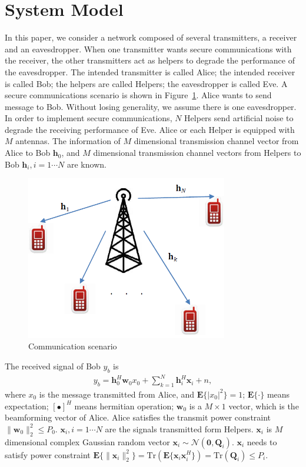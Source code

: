\documentclass[conference]{IEEEtran}
\begin{document}
\section{System Model} \label{sec:system model}
In this paper, we consider a network composed of several transmitters, a receiver and an eavesdropper. When one transmitter wants secure communications with the receiver, the other transmitters act as helpers to degrade the performance of the eavesdropper. The intended transmitter is called Alice; the intended receiver is called Bob; the helpers are called Helpers; the eavesdropper is called Eve. A secure communications scenario is shown in Figure~\ref{fig:system}. Alice wants to send message to Bob. Without losing generality, we assume there is one eavesdropper. In order to implement secure communications, $N$ Helpers send artificial noise to degrade the receiving performance of Eve.  Alice or each Helper is equipped with $M$ antennas. The information of $M$ dimensional transmission channel vector from Alice to Bob $\mathbf{h}_0$, and  $M$ dimensional transmission channel vectors from Helpers to Bob $\mathbf{h}_i, i = 1 \cdots N$ are known.
\begin{figure}[!htbp]
	\centering
	\includegraphics[width=8.8cm]{system.png} %
	\caption{Communication scenario}
	\label{fig:system}
\end{figure}
The received signal of Bob $y_b$ is
\begin{eqnarray}
y_b =\mathbf{h}_0^{H}\mathbf{w}_0x_0 + \sum_{k=1}^N \mathbf{h}_{i}^H\mathbf{x}_{i} + n,
\end{eqnarray}
where $x_0$ is the message transmitted from Alice, and $\mathbf{E}\{|x_0|^2\} = 1$; $\mathbf{E}\{\cdot\}$ means expectation; $[\bullet]^H$ means hermitian operation; $\mathbf{w}_{0}$ is a $M \times 1$ vector, which is the beamforming vector of Alice. Alice satisfies the transmit power constraint $\|\mathbf{w}_0\|_2^2 \leq P_0$. $\mathbf{x}_i, i = 1 \cdots N $ are the signals transmitted form Helpers. $\mathbf{x}_i$ is $M$ dimensional  complex Gaussian random vector $\mathbf{x}_i \sim \mathcal{N}(\mathbf{0}, \mathbf{Q}_i)$. $\mathbf{x}_i$ needs to satisfy power constraint $\mathbf{E}\{\|\mathbf{x}_i\|_2^2\}  = \mathrm{Tr}(\mathbf{E}\{\mathbf{x}_i\mathbf{x}_i^H\} )= \mathrm{Tr}(\mathbf{Q}_i) \leq P_i$. 
\end{document}
